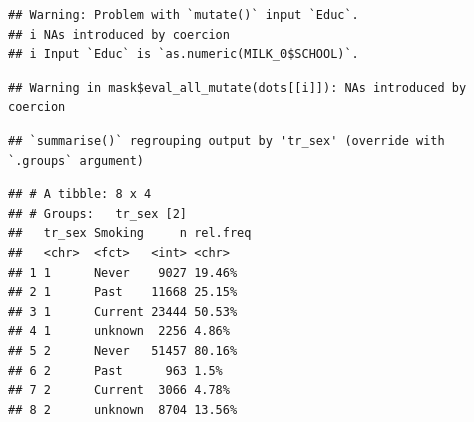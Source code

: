 \documentclass[
]{article}
\newenvironment{Shaded}{\begin{snugshade}}{\end{snugshade}}
\newcommand{\DataTypeTok}[1]{\textcolor[rgb]{0.13,0.29,0.53}{#1}}
\newcommand{\DecValTok}[1]{\textcolor[rgb]{0.00,0.00,0.81}{#1}}
\newcommand{\KeywordTok}[1]{\textcolor[rgb]{0.13,0.29,0.53}{\textbf{#1}}}
\newcommand{\NormalTok}[1]{#1}
\newcommand{\OperatorTok}[1]{\textcolor[rgb]{0.81,0.36,0.00}{\textbf{#1}}}
\newcommand{\OtherTok}[1]{\textcolor[rgb]{0.56,0.35,0.01}{#1}}
\newcommand{\StringTok}[1]{\textcolor[rgb]{0.31,0.60,0.02}{#1}}
\begin{document}
\begin{verbatim}
## Warning: Problem with `mutate()` input `Educ`.
## i NAs introduced by coercion
## i Input `Educ` is `as.numeric(MILK_0$SCHOOL)`.
\end{verbatim}

\begin{verbatim}
## Warning in mask$eval_all_mutate(dots[[i]]): NAs introduced by coercion
\end{verbatim}

\begin{Shaded}
\end{Shaded}

\begin{verbatim}
## `summarise()` regrouping output by 'tr_sex' (override with `.groups` argument)
\end{verbatim}

\begin{verbatim}
## # A tibble: 8 x 4
## # Groups:   tr_sex [2]
##   tr_sex Smoking     n rel.freq
##   <chr>  <fct>   <int> <chr>   
## 1 1      Never    9027 19.46%  
## 2 1      Past    11668 25.15%  
## 3 1      Current 23444 50.53%  
## 4 1      unknown  2256 4.86%   
## 5 2      Never   51457 80.16%  
## 6 2      Past      963 1.5%    
## 7 2      Current  3066 4.78%   
## 8 2      unknown  8704 13.56%
\end{verbatim}

\begin{Shaded}
\end{Shaded}
\end{document}
